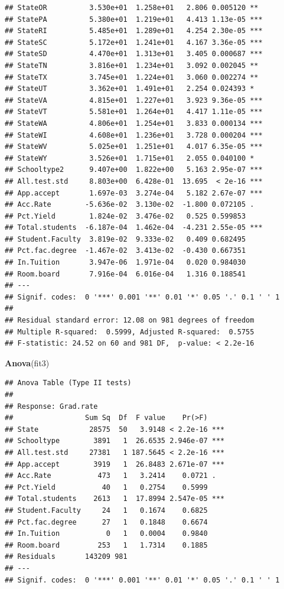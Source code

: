 \documentclass[]{article}
\newenvironment{Shaded}{\begin{snugshade}}{\end{snugshade}}
\newcommand{\KeywordTok}[1]{\textcolor[rgb]{0.13,0.29,0.53}{\textbf{#1}}}
\newcommand{\NormalTok}[1]{#1}
\begin{document}
\begin{verbatim}
## StateOR          3.530e+01  1.258e+01   2.806 0.005120 ** 
## StatePA          5.380e+01  1.219e+01   4.413 1.13e-05 ***
## StateRI          5.485e+01  1.289e+01   4.254 2.30e-05 ***
## StateSC          5.172e+01  1.241e+01   4.167 3.36e-05 ***
## StateSD          4.470e+01  1.313e+01   3.405 0.000687 ***
## StateTN          3.816e+01  1.234e+01   3.092 0.002045 ** 
## StateTX          3.745e+01  1.224e+01   3.060 0.002274 ** 
## StateUT          3.362e+01  1.491e+01   2.254 0.024393 *  
## StateVA          4.815e+01  1.227e+01   3.923 9.36e-05 ***
## StateVT          5.581e+01  1.264e+01   4.417 1.11e-05 ***
## StateWA          4.806e+01  1.254e+01   3.833 0.000134 ***
## StateWI          4.608e+01  1.236e+01   3.728 0.000204 ***
## StateWV          5.025e+01  1.251e+01   4.017 6.35e-05 ***
## StateWY          3.526e+01  1.715e+01   2.055 0.040100 *  
## Schooltype2      9.407e+00  1.822e+00   5.163 2.95e-07 ***
## All.test.std     8.803e+00  6.428e-01  13.695  < 2e-16 ***
## App.accept       1.697e-03  3.274e-04   5.182 2.67e-07 ***
## Acc.Rate        -5.636e-02  3.130e-02  -1.800 0.072105 .  
## Pct.Yield        1.824e-02  3.476e-02   0.525 0.599853    
## Total.students  -6.187e-04  1.462e-04  -4.231 2.55e-05 ***
## Student.Faculty  3.819e-02  9.333e-02   0.409 0.682495    
## Pct.fac.degree  -1.467e-02  3.413e-02  -0.430 0.667351    
## In.Tuition       3.947e-06  1.971e-04   0.020 0.984030    
## Room.board       7.916e-04  6.016e-04   1.316 0.188541    
## ---
## Signif. codes:  0 '***' 0.001 '**' 0.01 '*' 0.05 '.' 0.1 ' ' 1
## 
## Residual standard error: 12.08 on 981 degrees of freedom
## Multiple R-squared:  0.5999, Adjusted R-squared:  0.5755 
## F-statistic: 24.52 on 60 and 981 DF,  p-value: < 2.2e-16
\end{verbatim}

\begin{Shaded}
\begin{Highlighting}[]
\KeywordTok{Anova}\NormalTok{(fit3)}
\end{Highlighting}
\end{Shaded}

\begin{verbatim}
## Anova Table (Type II tests)
## 
## Response: Grad.rate
##                 Sum Sq  Df  F value    Pr(>F)    
## State            28575  50   3.9148 < 2.2e-16 ***
## Schooltype        3891   1  26.6535 2.946e-07 ***
## All.test.std     27381   1 187.5645 < 2.2e-16 ***
## App.accept        3919   1  26.8483 2.671e-07 ***
## Acc.Rate           473   1   3.2414    0.0721 .  
## Pct.Yield           40   1   0.2754    0.5999    
## Total.students    2613   1  17.8994 2.547e-05 ***
## Student.Faculty     24   1   0.1674    0.6825    
## Pct.fac.degree      27   1   0.1848    0.6674    
## In.Tuition           0   1   0.0004    0.9840    
## Room.board         253   1   1.7314    0.1885    
## Residuals       143209 981                       
## ---
## Signif. codes:  0 '***' 0.001 '**' 0.01 '*' 0.05 '.' 0.1 ' ' 1
\end{verbatim}
\end{document}
